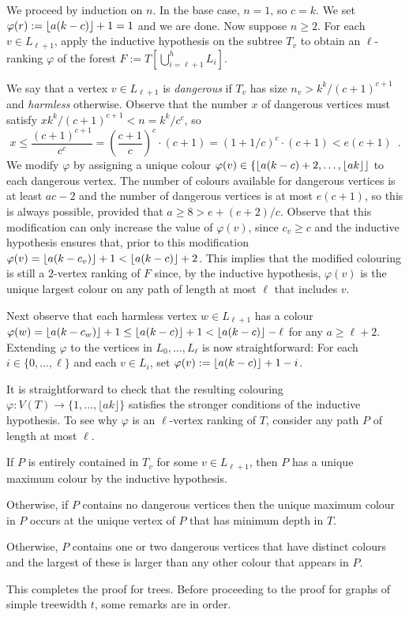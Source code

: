 \documentclass[kpfonts]{patmorin}
\theoremstyle{named}
\begin{document}
We proceed by induction on $n$. In the base case, $n=1$, so $c=k$.  We set $\varphi(r):={\lfloor a(k-c) \rfloor}+1=1$ and we are done. Now suppose $n\ge 2$.  For each $v\in L_{\ell+1}$, apply the inductive hypothesis on the subtree $T_v$ to obtain an $\ell$-ranking $\varphi$ of the forest $F:=T[\bigcup_{i=\ell+1}^h L_i]$.

We say that a vertex $v\in L_{\ell+1}$ is \emph{dangerous} if $T_v$ has size $n_v> k^k/(c+1)^{c+1}$ and \emph{harmless} otherwise.  Observe that the number $x$ of dangerous vertices must satisfy $xk^k/(c+1)^{c+1} < n = k^k/c^c$, so
\[
  x \le \frac{(c+1)^{c+1}}{c^c} = \left(\frac{c+1}{c}\right)^c\cdot(c+1)
  = (1+1/c)^c\cdot (c+1) < e(c+1) \enspace .
\]
We modify $\varphi$ by assigning a unique colour $\varphi(v)\in\{{\lfloor a(k-c)+2,\ldots,{\lfloor ak \rfloor} \rfloor}$ to each dangerous vertex.  The number of colours available for dangerous vertices is at least $ac-2$ and the number of dangerous vertices is at most $e(c+1)$, so this is always possible, provided that
$a \ge 8 > e + (e+2)/c$.  Observe that this modification can only increase the value of $\varphi(v)$, since $c_v \ge c$ and the inductive hypothesis ensures that, prior to this modification $\varphi(v)={\lfloor a(k-c_v) \rfloor}+1 < {\lfloor a(k-c) \rfloor}+2$.  This implies that the modified colouring is still a $2$-vertex ranking of $F$ since, by the inductive hypothesis, $\varphi(v)$ is the unique largest colour on any path of length at most $\ell$ that includes $v$.

Next observe that each harmless vertex $w\in L_{\ell+1}$ has a colour $\varphi(w) = {\lfloor a(k-c_w) \rfloor}+1 \le {\lfloor a(k-c) \rfloor}+1 < {\lfloor a(k-c) \rfloor}-\ell$ for any $a\ge \ell+2$. Extending $\varphi$ to the vertices in $L_0,\ldots,L_{\ell}$ is now straightforward:  For each $i\in\{0,\ldots,\ell\}$ and each $v\in L_i$, set $\varphi(v):={\lfloor a(k-c) \rfloor}+1-i$.

It is straightforward to check that the resulting colouring $\varphi:V(T)\to\{1,\ldots,\lfloor ak\rfloor\}$ satisfies the stronger conditions of the inductive hypothesis.  To see why $\varphi$ is an $\ell$-vertex ranking of $T$, consider any path $P$ of length at most $\ell$.
\begin{compactitem}
  \item If $P$ is entirely contained in $T_v$ for some $v\in L_{\ell+1}$, then $P$ has a unique maximum colour by the inductive hypothesis.

  \item Otherwise, if $P$ contains no dangerous vertices then the unique maximum colour in $P$ occurs at the unique vertex of $P$ that has minimum depth in $T$.

  \item Otherwise, $P$ contains one or two dangerous vertices that have distinct colours and the largest of these is larger than any other colour that appears in $P$.
\end{compactitem}
This completes the proof for trees.  Before proceeding to the proof for graphs of simple treewidth $t$, some remarks are in order.
\end{document}
